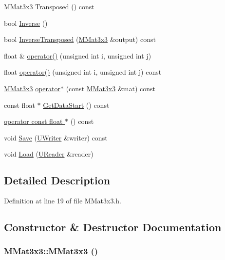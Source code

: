 \begin{CompactItemize}
\item 
\hyperlink{class_m_mat3x3}{MMat3x3} \hyperlink{class_m_mat3x3_a01f61e6a6c501a6d777a6d8c980736d}{Transposed} () const 
\item 
bool \hyperlink{class_m_mat3x3_b4b44fc1b81ea6b43cc272ed9433e584}{Inverse} ()
\item 
bool \hyperlink{class_m_mat3x3_b2aa137135d4743f57910a2958eacd2b}{InverseTransposed} (\hyperlink{class_m_mat3x3}{MMat3x3} \&output) const 
\item 
float \& \hyperlink{class_m_mat3x3_31c4291012e2002e0840a9d744c29f83}{operator()} (unsigned int i, unsigned int j)
\item 
float \hyperlink{class_m_mat3x3_41deda72139584e5d8f2d6191387f0aa}{operator()} (unsigned int i, unsigned int j) const 
\item 
\hyperlink{class_m_mat3x3}{MMat3x3} \hyperlink{class_m_mat3x3_41ee55d1d606a5018fe404e0e4938b84}{operator$\ast$} (const \hyperlink{class_m_mat3x3}{MMat3x3} \&mat) const 
\item 
const float $\ast$ \hyperlink{class_m_mat3x3_604ffd6c5ec41b1912146e692074bab0}{GetDataStart} () const 
\item 
\hyperlink{class_m_mat3x3_95b4cd80d8d663a4210f8645ee91bc7b}{operator const float $\ast$} () const 
\item 
void \hyperlink{class_m_mat3x3_fda8bdfde06537ba03acee59fbffc41a}{Save} (\hyperlink{class_u_writer}{UWriter} \&writer) const 
\item 
void \hyperlink{class_m_mat3x3_00cd1ab58183f2bacce2e2e38ac77363}{Load} (\hyperlink{class_u_reader}{UReader} \&reader)
\end{CompactItemize}


\subsection{Detailed Description}


Definition at line 19 of file MMat3x3.h.

\subsection{Constructor \& Destructor Documentation}
\hypertarget{class_m_mat3x3_f7123b5212981cb6a5267a8dbf8e86ec}{
\subsubsection[{MMat3x3}]{\setlength{\rightskip}{0pt plus 5cm}MMat3x3::MMat3x3 ()}}
\label{class_m_mat3x3_f7123b5212981cb6a5267a8dbf8e86ec}




